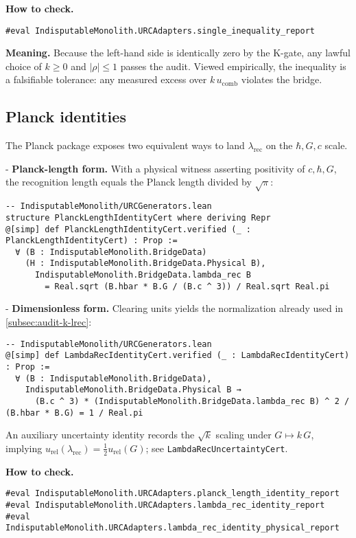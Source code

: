 \documentclass[11pt,a4paper,twoside]{article}
\numberwithin{equation}{section}
\theoremstyle{customthm}
\theoremstyle{customdef}
\theoremstyle{customrem}
\begin{document}
\noindent \textbf{How to check.}
\begin{lstlisting}
#eval IndisputableMonolith.URCAdapters.single_inequality_report
\end{lstlisting}

\noindent \textbf{Meaning.} Because the left-hand side is identically zero by the K-gate, any lawful choice of \(k\ge 0\) and \(|\rho|\le 1\) passes the audit. Viewed empirically, the inequality is a falsifiable tolerance: any measured excess over \(k\,u_{\mathrm{comb}}\) violates the bridge.

\subsection{Planck identities}\label{subsec:audit-planck}

The Planck package exposes two equivalent ways to land \(\lambda_{\mathrm{rec}}\) on the \(\hbar,G,c\) scale.

- \textbf{Planck-length form.} With a physical witness asserting positivity of \(c,\hbar,G\), the recognition length equals the Planck length divided by \(\sqrt{\pi}\):
\begin{lstlisting}
-- IndisputableMonolith/URCGenerators.lean
structure PlanckLengthIdentityCert where deriving Repr
@[simp] def PlanckLengthIdentityCert.verified (_ : PlanckLengthIdentityCert) : Prop :=
  ∀ (B : IndisputableMonolith.BridgeData)
    (H : IndisputableMonolith.BridgeData.Physical B),
      IndisputableMonolith.BridgeData.lambda_rec B
        = Real.sqrt (B.hbar * B.G / (B.c ^ 3)) / Real.sqrt Real.pi
\end{lstlisting}

- \textbf{Dimensionless form.} Clearing units yields the normalization already used in \cref{subsec:audit-k-lrec}:
\begin{lstlisting}
-- IndisputableMonolith/URCGenerators.lean
@[simp] def LambdaRecIdentityCert.verified (_ : LambdaRecIdentityCert) : Prop :=
  ∀ (B : IndisputableMonolith.BridgeData),
    IndisputableMonolith.BridgeData.Physical B →
      (B.c ^ 3) * (IndisputableMonolith.BridgeData.lambda_rec B) ^ 2 / (B.hbar * B.G) = 1 / Real.pi
\end{lstlisting}

An auxiliary uncertainty identity records the \(\sqrt{k}\) scaling under \(G\mapsto k\,G\), implying \(u_{\mathrm{rel}}(\lambda_{\mathrm{rec}})=\tfrac12 u_{\mathrm{rel}}(G)\); see \texttt{LambdaRecUncertaintyCert}.

\noindent \textbf{How to check.}
\begin{lstlisting}
#eval IndisputableMonolith.URCAdapters.planck_length_identity_report
#eval IndisputableMonolith.URCAdapters.lambda_rec_identity_report
#eval IndisputableMonolith.URCAdapters.lambda_rec_identity_physical_report
\end{lstlisting}
\end{document}

